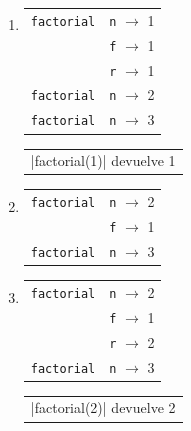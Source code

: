 \begin{enumerate}
\item {}
	\begin{tabular}{r|l|}
	\hline
	\currentframe \verb|factorial| & \verb|n| $\rightarrow$ 1 \\
	                               & \verb|f| $\rightarrow$ 1 \\
	                               & \verb|r| $\rightarrow$ 1 \\
	\hline
	\hline
	              \verb|factorial| & \verb|n| $\rightarrow$ 2 \\
	\hline
	\hline
	              \verb|factorial| & \verb|n| $\rightarrow$ 3 \\
	\hline
	\end{tabular}
	\begin{tabular}{l}
    |factorial(1)| devuelve 1
	\end{tabular}

\item {}
	\begin{tabular}{r|l|}
	\hline
	\currentframe \verb|factorial| & \verb|n| $\rightarrow$ 2 \\
	                               & \verb|f| $\rightarrow$ 1 \\
	\hline
	\hline
	              \verb|factorial| & \verb|n| $\rightarrow$ 3 \\
	\hline
	\end{tabular}

\item {}
	\begin{tabular}{r|l|}
	\hline
	\currentframe \verb|factorial| & \verb|n| $\rightarrow$ 2 \\
	                               & \verb|f| $\rightarrow$ 1 \\
	                               & \verb|r| $\rightarrow$ 2 \\
	\hline
	\hline
	              \verb|factorial| & \verb|n| $\rightarrow$ 3 \\
	\hline
	\end{tabular}
	\begin{tabular}{l}
    |factorial(2)| devuelve 2
	\end{tabular}


\end{enumerate}
